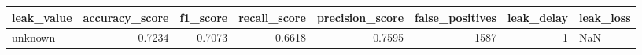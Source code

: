 \begin{tabular}{lrrrrrrl}
\toprule
leak\_value & accuracy\_score & f1\_score & recall\_score & precision\_score & false\_positives & leak\_delay & leak\_loss \\
\midrule
unknown & 0.7234 & 0.7073 & 0.6618 & 0.7595 & 1587 & 1 & NaN \\
\bottomrule
\end{tabular}
